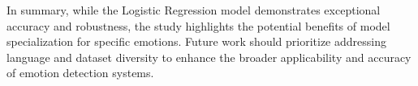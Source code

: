 In summary, while the Logistic Regression model demonstrates exceptional accuracy and robustness, the study highlights the potential benefits of model specialization for specific emotions. Future work should prioritize addressing language and dataset diversity to enhance the broader applicability and accuracy of emotion detection systems.